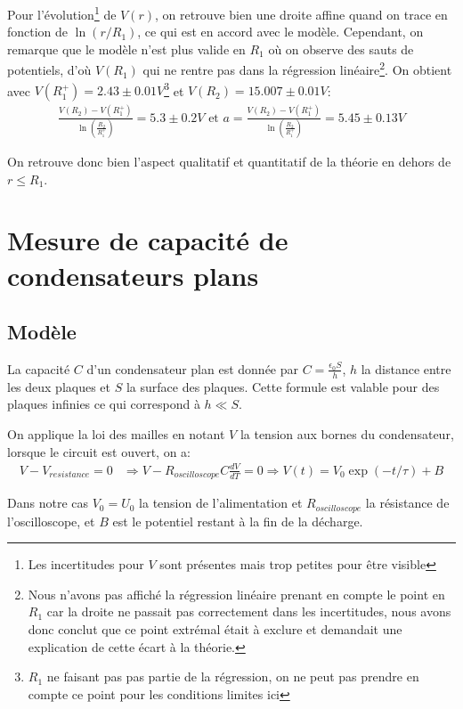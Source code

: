\documentclass[12pt]{article}
\begin{document}
	Pour l'évolution\footnote{Les incertitudes pour $V$ sont présentes mais trop petites pour être visible} de $V(r)$, on retrouve bien une droite affine quand on trace en fonction de $\ln(r/R_1)$, ce qui est en accord avec le modèle. Cependant,
	on remarque que le modèle n'est plus valide en $R_1$ où on observe des sauts de potentiels, d'où $V(R_1)$ qui ne rentre pas dans la régression linéaire\footnote{Nous n'avons pas affiché la régression linéaire prenant en compte le point en $R_1$ car la droite ne passait pas correctement dans les incertitudes, nous avons donc conclut que ce point extrémal était à exclure et demandait une explication de cette écart à la théorie.}.
	On obtient avec $V(R_1^+) = 2.43 \pm 0.01V$\footnote{$R_1$ ne faisant pas pas partie de la régression, on ne peut pas prendre en compte ce point pour les conditions limites ici} et $V(R_2) = 15.007 \pm 0.01V$:
	\begin{align*}
		\frac{V(R_2) - V(R_1^+)}{\ln(\frac{R_2}{R_1^+})} = 5.3 \pm 0.2 V \text{ et } a = \frac{V(R_2) - V(R_1^+)}{\ln(\frac{R_2}{R_1^+})} = 5.45 \pm 0.13 V
	\end{align*}

	On retrouve donc bien l'aspect qualitatif et quantitatif de la théorie en dehors de $r \leq R_1$.
	
\section{Mesure de capacité de condensateurs plans}
	\subsection{Modèle}
	La capacité $C$ d'un condensateur plan est donnée par $C = \frac{\epsilon_0 S}{h}$, $h$ la distance entre les deux plaques et $S$ la surface des plaques. Cette formule est valable pour des plaques infinies ce qui correspond à $h \ll S$.

	On applique la loi des mailles en notant $V$ la tension aux bornes du condensateur, lorsque le circuit est ouvert, on a:
	\begin{align*}
		V - V_{resistance} = 0 & \Rightarrow V - R_{oscilloscope}C \frac{dV}{dT} = 0 \Rightarrow V(t) = V_0 \exp(-t/\tau) + B
	\end{align*}

	Dans notre cas $V_0 = U_0$ la tension de l'alimentation et $R_{oscilloscope}$ la résistance de l'oscilloscope, et $B$ est le potentiel restant à la fin de la décharge.
	
\end{document}
